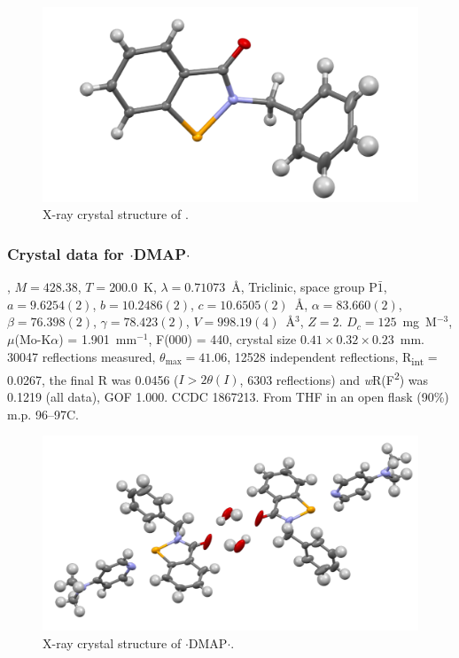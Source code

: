 \begin{refsection}
    \begin{figure}
      \includegraphics[width=0.6\linewidth]{Figures/ebs-bn-xtal.pdf}
      \caption{X-ray crystal structure of \texorpdfstring{}{C14H11NOSe}.}
    \end{figure}
    
    \subsubsection{Crystal data for \texorpdfstring{$ \cdot $DMAP$ \cdot $}{C21H21N3OSe.(H2O)}}
    , $M=428.38$, $T=200.0$~K, $ \lambda=0.71073 $~\AA, Triclinic, space group P$\bar{1}$, $a = 9.6254(2)$, $b = 10.2486(2)$, $c = 10.6505(2)$~\AA, $\alpha = 83.660(2)$\degree, $\beta = 76.398(2)$\degree, $\gamma = 78.423(2)$\degree, $V = 998.19(4)$~\AA$^{3}$, $Z = 2$.
    $D_{c}= 125$~mg~M$^{-3}$, $\mu$(Mo-K$\alpha$) = 1.901~mm$^{-1}$, F(000) = 440, crystal size $0.41 \times 0.32 \times 0.23$~mm.
    30047 reflections measured, $\theta_{\max} = 41.06$\degree, 12528 independent reflections, R\textsubscript{int} = 0.0267, the final R was 0.0456 ($I > 2\theta(I)$, 6303 reflections) and \textit{w}R(F\textsuperscript{2}) was 0.1219 (all data), GOF 1.000.
    CCDC 1867213.
    From THF in an open flask (90\%) m.p. 96--97\degree{}C.
    
    \begin{figure}
      \includegraphics[width=0.6\linewidth]{Figures/ebs-bn-dmap-hydrate-xtal.pdf}
      \caption{X-ray crystal structure of \texorpdfstring{$ \cdot $DMAP$ \cdot $}{C21H21N3OSe.(H2O)}.}
    \end{figure}
    

\end{refsection}
